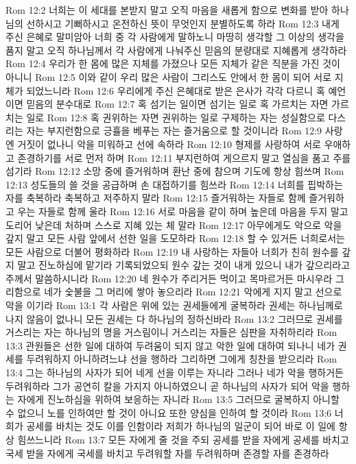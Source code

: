 Rom 12:2  너희는 이 세대를 본받지 말고 오직 마음을 새롭게 함으로 변화를 받아 하나님의 선하시고 기뻐하시고 온전하신 뜻이 무엇인지 분별하도록 하라
Rom 12:3  내게 주신 은혜로 말미암아 너희 중 각 사람에게 말하노니 마땅히 생각할 그 이상의 생각을 품지 말고 오직 하나님께서 각 사람에게 나눠주신 믿음의 분량대로 지혜롭게 생각하라
Rom 12:4  우리가 한 몸에 많은 지체를 가졌으나 모든 지체가 같은 직분을 가진 것이 아니니
Rom 12:5  이와 같이 우리 많은 사람이 그리스도 안에서 한 몸이 되어 서로 지체가 되었느니라
Rom 12:6  우리에게 주신 은혜대로 받은 은사가 각각 다르니 혹 예언이면 믿음의 분수대로
Rom 12:7  혹 섬기는 일이면 섬기는 일로 혹 가르치는 자면 가르치는 일로
Rom 12:8  혹 권위하는 자면 권위하는 일로 구제하는 자는 성실함으로 다스리는 자는 부지런함으로 긍휼을 베푸는 자는 즐거움으로 할 것이니라
Rom 12:9  사랑엔 거짓이 없나니 악을 미워하고 선에 속하라
Rom 12:10  형제를 사랑하여 서로 우애하고 존경하기를 서로 먼저 하며
Rom 12:11  부지런하여 게으르지 말고 열심을 품고 주를 섬기라
Rom 12:12  소망 중에 즐거워하며 환난 중에 참으며 기도에 항상 힘쓰며
Rom 12:13  성도들의 쓸 것을 공급하며 손 대접하기를 힘쓰라
Rom 12:14  너희를 핍박하는 자를 축복하라 축복하고 저주하지 말라
Rom 12:15  즐거워하는 자들로 함께 즐거워하고 우는 자들로 함께 울라
Rom 12:16  서로 마음을 같이 하며 높은데 마음을 두지 말고 도리어 낮은데 처하며 스스로 지혜 있는 체 말라
Rom 12:17  아무에게도 악으로 악을 갚지 말고 모든 사람 앞에서 선한 일을 도모하라
Rom 12:18  할 수 있거든 너희로서는 모든 사람으로 더불어 평화하라
Rom 12:19  내 사랑하는 자들아 너희가 친히 원수를 갚지 말고 진노하심에 맡기라 기록되었으되 원수 갚는 것이 내게 있으니 내가 갚으리라고 주께서 말씀하시니라
Rom 12:20  네 원수가 주리거든 먹이고 목마르거든 마시우라 그리함으로 네가 숯불을 그 머리에 쌓아 놓으리라
Rom 12:21  악에게 지지 말고 선으로 악을 이기라
Rom 13:1  각 사람은 위에 있는 권세들에게 굴복하라 권세는 하나님께로 나지 않음이 없나니 모든 권세는 다 하나님의 정하신바라
Rom 13:2  그러므로 권세를 거스리는 자는 하나님의 명을 거스림이니 거스리는 자들은 심판을 자취하리라
Rom 13:3  관원들은 선한 일에 대하여 두려움이 되지 않고 악한 일에 대하여 되나니 네가 권세를 두려워하지 아니하려느냐 선을 행하라 그리하면 그에게 칭찬을 받으리라
Rom 13:4  그는 하나님의 사자가 되어 네게 선을 이루는 자니라 그러나 네가 악을 행하거든 두려워하라 그가 공연히 칼을 가지지 아니하였으니 곧 하나님의 사자가 되어 악을 행하는 자에게 진노하심을 위하여 보응하는 자니라
Rom 13:5  그러므로 굴복하지 아니할 수 없으니 노를 인하여만 할 것이 아니요 또한 양심을 인하여 할 것이라
Rom 13:6  너희가 공세를 바치는 것도 이를 인함이라 저희가 하나님의 일군이 되어 바로 이 일에 항상 힘쓰느니라
Rom 13:7  모든 자에게 줄 것을 주되 공세를 받을 자에게 공세를 바치고 국세 받을 자에게 국세를 바치고 두려워할 자를 두려워하며 존경할 자를 존경하라
